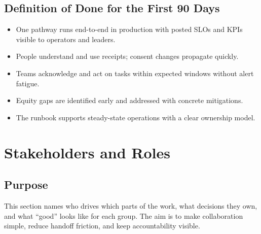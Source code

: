 \documentclass[12pt]{article}
\begin{document}
\subsection*{Definition of Done for the First 90 Days}
\begin{itemize}[leftmargin=*]
  \item One pathway runs end-to-end in production with posted SLOs and KPIs visible to operators and leaders.
  \item People understand and use receipts; consent changes propagate quickly.
  \item Teams acknowledge and act on tasks within expected windows without alert fatigue.
  \item Equity gaps are identified early and addressed with concrete mitigations.
  \item The runbook supports steady-state operations with a clear ownership model.
\end{itemize}

\section{Stakeholders and Roles}

\subsection*{Purpose}
This section names who drives which parts of the work, what decisions they own, and what “good” looks like for each group. The aim is to make collaboration simple, reduce handoff friction, and keep accountability visible.
\end{document}
